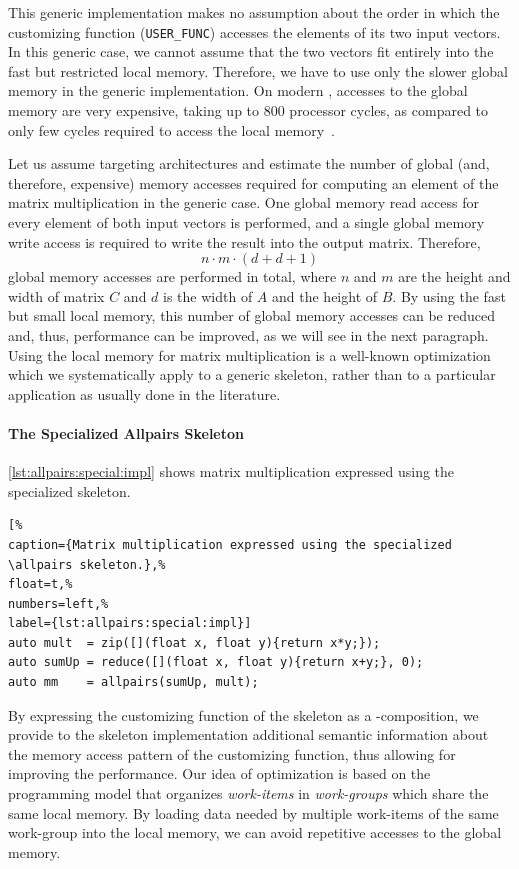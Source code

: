 This generic implementation makes no assumption about the order in which the customizing function (\texttt{USER\_FUNC}) accesses the elements of its two input vectors.
In this generic case, we cannot assume that the two vectors fit entirely into the fast but restricted \GPU local memory.
Therefore, we have to use only the slower global memory in the generic implementation.
On modern \GPUs, accesses to the global memory are very expensive, taking up to 800 processor cycles, as compared to only few cycles required to access the local memory~\cite{CUDAProgrammingGuide}.

Let us assume targeting \GPU architectures and estimate the number of global (and, therefore, expensive) memory accesses required for computing an element of the matrix multiplication in the generic case.
One global memory read access for every element of both input vectors is performed, and a single global memory write access is required to write the result into the output matrix.
Therefore,
\begin{equation}
  n\cdot m\cdot (d + d + 1)
  \label{eq:mm:accesses}
\end{equation}
global memory accesses are performed in total, where $n$ and $m$ are the height and width of matrix $C$ and $d$ is the width of $A$ and the height of $B$.
By using the fast but small local memory, this number of global memory accesses can be reduced and, thus, performance can be improved, as we will see in the next paragraph.
Using the local memory for matrix multiplication is a well-known optimization which we systematically apply to a generic skeleton, rather than to a particular application as usually done in the literature.

\pagebreak

\paragraph{The Specialized Allpairs Skeleton}
\autoref{lst:allpairs:special:impl} shows matrix multiplication expressed using the specialized \allpairs skeleton.
\begin{lstlisting}[%
caption={Matrix multiplication expressed using the specialized \allpairs skeleton.},%
float=t,%
numbers=left,%
label={lst:allpairs:special:impl}]
auto mult  = zip([](float x, float y){return x*y;});
auto sumUp = reduce([](float x, float y){return x+y;}, 0);
auto mm    = allpairs(sumUp, mult);
\end{lstlisting}
%
By expressing the customizing function of the \allpairs skeleton as a \zip-\reduce composition, we provide to the skeleton implementation additional semantic information about the memory access pattern of the customizing function, thus allowing for improving the performance.
Our idea of optimization is based on the \OpenCL programming model that organizes \emph{work-items} in \emph{work-groups} which share the same \GPU local memory.
By loading data needed by multiple work-items of the same work-group into the local memory, we can avoid repetitive accesses to the global memory.

